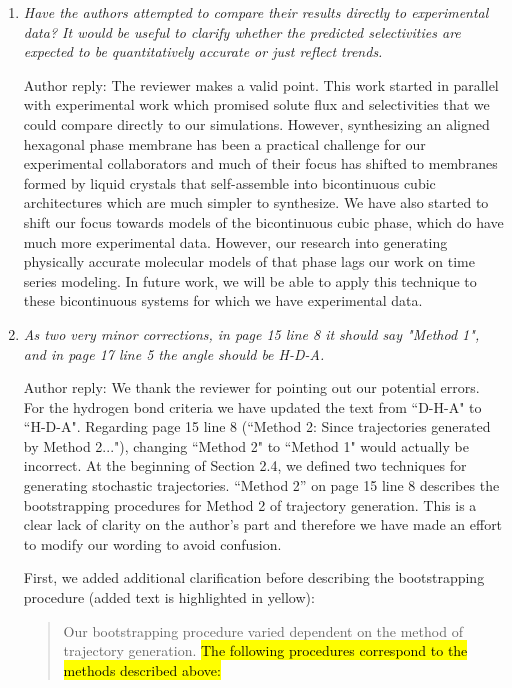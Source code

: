 \documentclass{article}
\begin{document}
\begin{enumerate}[label={Comment \theenumi :}, leftmargin=3.9\parindent]
    \item \textit{Have the authors attempted to compare their results directly to experimental data? 
    It would be useful to clarify whether the predicted selectivities are expected to be quantitatively
    accurate or just reflect trends.}
		 
    Author reply: The reviewer makes a valid point. This work started in parallel with experimental
    work which promised solute flux and selectivities that we could compare directly to our
	simulations. However, synthesizing an aligned hexagonal phase membrane has been a practical
	challenge for our experimental collaborators and much of their focus has shifted to 
	membranes formed by liquid crystals that self-assemble into bicontinuous cubic architectures
	which are much simpler to synthesize. We have also started to shift our focus towards models 
	of the bicontinuous cubic phase, which do have much more experimental data. However, our 
	research into generating physically accurate molecular models of that phase lags our work on
	time series modeling. In future work, we will be able to apply this technique to these 
	bicontinuous systems for which we have experimental data.

    \item \textit{As two very minor corrections, in page 15 line 8 it should say "Method 1", and in 
    page 17 line 5 the angle should be H-D-A.}
    
    Author reply: We thank the reviewer for pointing out our potential errors. For the hydrogen bond
    criteria we have updated the text from ``D-H-A" to ``H-D-A". Regarding page 15 line 8 (``Method 2:
    Since trajectories generated by Method 2..."), changing ``Method 2" to ``Method 1" would actually be 
    incorrect. At the beginning of Section 2.4, we defined two techniques for generating stochastic 
    trajectories. ``Method 2'' on page 15 line 8 describes the bootstrapping procedures for Method 2 of
    trajectory generation. This is a clear lack of clarity on the author's part and therefore we 
    have made an effort to modify our wording to avoid confusion.
    
    First, we added additional clarification before describing the bootstrapping procedure (added text
    is highlighted in yellow):
    \begin{quote}
    Our bootstrapping procedure varied dependent on the method of trajectory generation. \hl{
    The following procedures correspond to the methods described above:}
    \end{quote}
    

\end{enumerate}
\end{document}
